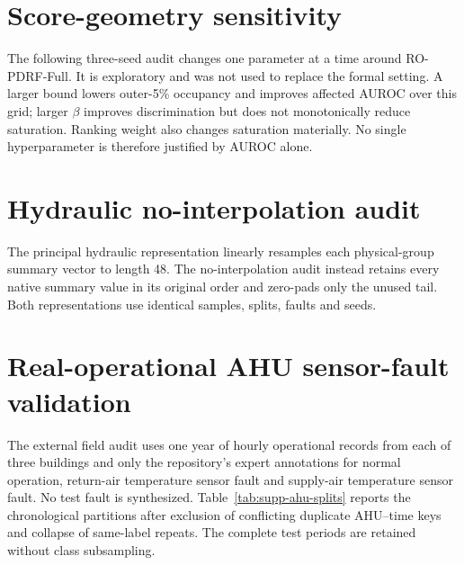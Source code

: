 \documentclass[10pt]{article}
\begin{document}
\section{Score-geometry sensitivity}

The following three-seed audit changes one parameter at a time around RO-PDRF-Full. It is exploratory and was not used to replace the formal setting. A larger bound lowers outer-5\% occupancy and improves affected AUROC over this grid; larger $\beta$ improves discrimination but does not monotonically reduce saturation. Ranking weight also changes saturation materially. No single hyperparameter is therefore justified by AUROC alone.

\begin{table}[ht]
\centering
\caption{Joint score-saturation, discrimination and calibration sensitivity. Values are means across three fixed development seeds.}
\resizebox{0.92\textwidth}{!}{}
\end{table}

\section{Hydraulic no-interpolation audit}

The principal hydraulic representation linearly resamples each physical-group summary vector to length 48. The no-interpolation audit instead retains every native summary value in its original order and zero-pads only the unused tail. Both representations use identical samples, splits, faults and seeds.

\begin{table}[ht]
\centering
\caption{Affected-subset macro-AUROC under controlled hydraulic pressure faults. Difference is RO-PDRF-NOQ minus CAGF.}
\resizebox{0.82\textwidth}{!}{}
\end{table}

\section{Real-operational AHU sensor-fault validation}

The external field audit uses one year of hourly operational records from each of three buildings and only the repository's expert annotations for normal operation, return-air temperature sensor fault and supply-air temperature sensor fault. No test fault is synthesized. Table~\ref{tab:supp-ahu-splits} reports the chronological partitions after exclusion of conflicting duplicate AHU--time keys and collapse of same-label repeats. The complete test periods are retained without class subsampling.
\end{document}
